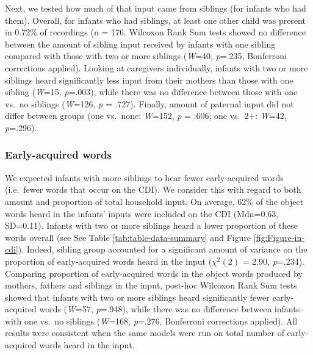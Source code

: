 \documentclass[
  english,
  man,floatsintext]{apa6}
\begin{document}
Next, we tested how much of that input came from siblings (for infants who had them). Overall, for infants who had siblings, at least one other child was present in 0.72\% of recordings (n = 176. Wilcoxon Rank Sum tests showed no difference between the amount of sibling input received by infants with one sibling compared with those with two or more siblings (\emph{W}=40, \emph{p}=.235, Bonferroni corrections applied). Looking at caregivers individually, infants with two or more siblings heard significantly less input from their mothers than those with one sibling (\emph{W}=15, \emph{p}=.003), while there was no difference between those with one vs.~no siblings (\emph{W}=126, \emph{p} = .727). Finally, amount of paternal input did not differ between groups (one vs.~none: \emph{W}=152, \emph{p} = .606; one vs.~2+: \emph{W}=42, \emph{p}=.296).

\hypertarget{early-acquired-words}{%
\subsubsection{Early-acquired words}\label{early-acquired-words}}

We expected infants with more siblings to hear fewer early-acquired words (i.e.~fewer words that occur on the CDI). We consider this with regard to both amount and proportion of total household input. On average, 62\% of the object words heard in the infants' inputs were included on the CDI (Mdn=0.63, SD=0.11). Infants with two or more siblings heard a lower proportion of these words overall (see See Table \ref{tab:table-data-summary} and Figure \ref{fig:Figure-in-cdi}). Indeed, sibling group accounted for a significant amount of variance on the proportion of early-acquired words heard in the input (\(\chi^2 (2)\) = 2.90, \emph{p}=.234). Comparing proportion of early-acquired words in the object words produced by mothers, fathers and siblings in the input, post-hoc Wilcoxon Rank Sum tests showed that infants with two or more siblings heard significantly fewer early-acquired words (\emph{W}=57, \emph{p}=.948), while there was no difference between infants with one vs.~no siblings (\emph{W}=168, \emph{p}=.276, Bonferroni corrections applied). All results were consistent when the same models were run on total number of early-acquired words heard in the input.
\end{document}
